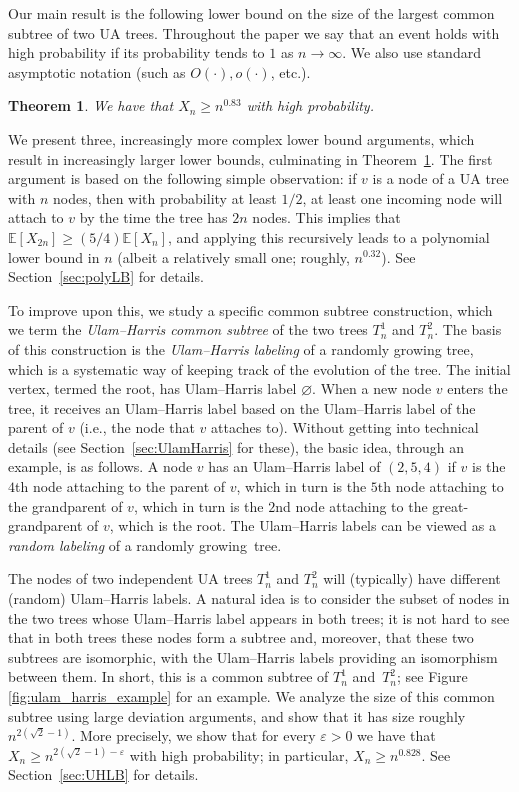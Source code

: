 \documentclass[11pt]{article}
\numberwithin{equation}{section}
\newcommand{\E}{\mathbb{E}} %
\newcommand{\eps}{\varepsilon} %
\newtheorem{theorem}{Theorem}[section]
\theoremstyle{definition}
\begin{document}
Our main result is the following lower bound on the size of the largest common subtree of two UA trees. 
Throughout the paper we say that an event holds with high probability if its probability tends to $1$ as $n \to \infty$. We also use standard asymptotic notation (such as $O(\cdot), o(\cdot)$, etc.).

\begin{theorem}\label{thm:main}
We have that $X_{n} \geq n^{0.83}$ with high probability.
\end{theorem}

We present three, increasingly more complex lower bound arguments, which result in increasingly larger lower bounds, culminating in Theorem~\ref{thm:main}. 
The first argument is based on the following simple observation: 
if $v$ is a node of a UA tree with $n$ nodes, 
then with probability at least $1/2$, at least one incoming node will attach to $v$ by the time the tree has $2n$ nodes. 
This implies that $\E[X_{2n}] \geq (5/4) \E[X_{n}]$, 
and applying this recursively leads to a polynomial lower bound in $n$ (albeit a relatively small one; roughly, $n^{0.32}$). 
See Section~\ref{sec:polyLB} for details. 

To improve upon this, we study a specific common subtree construction, which we term the 
\emph{Ulam--Harris common subtree} 
of the two trees $T_{n}^{1}$ and $T_{n}^{2}$. 
The basis of this construction is the \emph{Ulam--Harris labeling} of a randomly growing tree, which is a systematic way of keeping track of the evolution of the tree. 
The initial vertex, termed the root, has Ulam--Harris label $\varnothing$. 
When a new node $v$ enters the tree, it receives an Ulam--Harris label based on the Ulam--Harris label of the parent of $v$ (i.e., the node that $v$ attaches to).
Without getting into technical details (see Section~\ref{sec:UlamHarris} for these), the basic idea, through an example, is as follows. 
A node $v$ has an Ulam--Harris label of $(2,5,4)$ 
if $v$ is the $4$th node attaching to the parent of $v$, 
which in turn is the $5$th node attaching to the grandparent of $v$, 
which in turn is the $2$nd node attaching to the great-grandparent of $v$, 
which is the root. 
The Ulam--Harris labels can be viewed as a \emph{random labeling} of a randomly growing~tree. 

The nodes of two independent UA trees $T_{n}^{1}$ and $T_{n}^{2}$ will (typically) have different (random) Ulam--Harris labels. 
A natural idea is to consider the subset of nodes in the two trees whose Ulam--Harris label appears in both trees; 
it is not hard to see that in both trees these nodes form a subtree 
and, moreover, that these two subtrees are isomorphic, 
with the Ulam--Harris labels providing an isomorphism between them. 
In short, this is a common subtree of $T_{n}^{1}$ and~$T_{n}^{2}$;
see Figure \ref{fig:ulam_harris_example} for an example.
We analyze the size of this common subtree using large deviation arguments, and show that it has size roughly $n^{2(\sqrt{2}-1)}$. 
More precisely, we show that for every $\eps > 0$ 
we have that $X_{n} \geq n^{2(\sqrt{2}-1)-\eps}$ with high probability; in particular, $X_{n} \geq n^{0.828}$. See Section~\ref{sec:UHLB} for details. 
\end{document}
